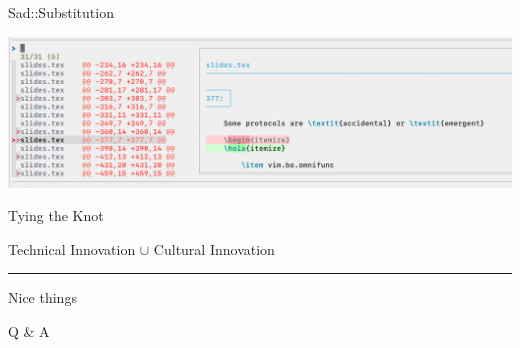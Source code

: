 \documentclass{beamer}
\begin{document}
\begin{frame}{Sad::Substitution}

	\includegraphics[width=\textwidth]{sad}

\end{frame}


\begin{frame}{Tying the Knot}

	\begin{centering}

		{\Large Technical Innovation $\cup$ Cultural Innovation}

		\rule{\textwidth}{0.1em}

		{\LARGE Nice things}

	\end{centering}

\end{frame}


\begin{frame}[standout]

	Q \& A

\end{frame}
\end{document}
